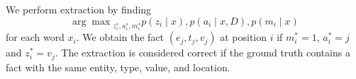 \documentclass[12pt]{article}
\begin{document}
We perform extraction by finding
$${\arg\max}_{z_i^*,a_i^*,m_i^*}p(z_i\mid x),p(a_i \mid x, D),p(m_i \mid x)$$
for each word $x_i$.
We obtain the fact $(e_j, t_j, v_j)$ at position $i$ if $m_i^*=1$,
$a_i^* = j$ and $z_i^* = v_j$.
The extraction is considered correct if the ground truth
contains a fact with the same entity, type, value, and location.

\begin{comment}

\subsection{Approximate the posterior of a generative model}
Alternatively, we may introduce a generative model of text $q(x, v)$ 
that inverts the relation extraction model $p(v \mid x)$ and optimize the following objective:
\begin{equation}
\log q(x,v) - KL[p(v,z,a,m \mid x) || q(v,z,a,m \mid x)]
\end{equation}
which entails training the generative model of text while approximating its
posterior with the information extraction system.

decompose the training of our extraction system $p(v\mid x)$ into two stages:
In the first stage we train $p(z,a,m\mid x,d)$ to approximate the posterior
of a conditional model of text given a complete KB $q(x,z,a,m \mid v,d)$.
This has the benefit of allowing us to exert control over where value mentions are detected
through our design of the text model $q$.

In the second stage, we have two choices:
a) train $p(v \mid z,a,m,x,d)$ to approximate the posterior of a full generative model of text and
the values of KB $q(x,v\mid d)$.
b) train $p(v \mid z,a,m,x,d)$ using the following lower bound:
\begin{equation}
\label{eqn:lowerbound2}
\log p(v\mid x,d) \geq
\Es{p(z,a,m\mid x,d)}{\log p(v\mid z,a,m, x,d)}
\end{equation}
Ideally the bound in Eqn.~\ref{eqn:lowerbound2}
should not be looser than the one presented in Eqn.~\ref{eqn:lowerbound},
as conditioning on the observed values of a KB should not reduce the entropy of
a good alignment model.

How do we split the gradient over time?

\end{comment}

%
%
\end{document}
